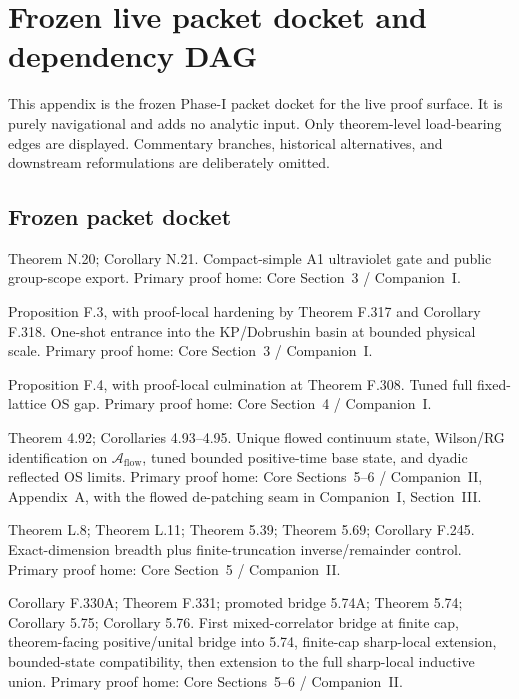 
\section{Frozen live packet docket and dependency DAG}\label{app:packet-docket}

This appendix is the frozen Phase-I packet docket for the live proof surface. It is purely navigational and adds no analytic input. Only theorem-level load-bearing edges are displayed. Commentary branches, historical alternatives, and downstream reformulations are deliberately omitted.

\subsection*{Frozen packet docket}
\begin{description}[leftmargin=2.2em,style=nextline]
\item[Packet 1.] Theorem N.20; Corollary N.21. Compact-simple A1 ultraviolet gate and public group-scope export. Primary proof home: Core Section~3 / Companion~I.
\item[Packet 2.] Proposition F.3, with proof-local hardening by Theorem F.317 and Corollary F.318. One-shot entrance into the KP/Dobrushin basin at bounded physical scale. Primary proof home: Core Section~3 / Companion~I.
\item[Packet 3.] Proposition F.4, with proof-local culmination at Theorem F.308. Tuned full fixed-lattice OS gap. Primary proof home: Core Section~4 / Companion~I.
\item[Packet 4.] Theorem 4.92; Corollaries 4.93--4.95. Unique flowed continuum state, Wilson/RG identification on $\mathcal A_{\mathrm{flow}}$, tuned bounded positive-time base state, and dyadic reflected OS limits. Primary proof home: Core Sections~5--6 / Companion~II, Appendix~A, with the flowed de-patching seam in Companion~I, Section~III.
\item[Packet 5.] Theorem L.8; Theorem L.11; Theorem 5.39; Theorem 5.69; Corollary F.245. Exact-dimension breadth plus finite-truncation inverse/remainder control. Primary proof home: Core Section~5 / Companion~II.
\item[Packet 6.] Corollary F.330A; Theorem F.331; promoted bridge 5.74A; Theorem 5.74; Corollary 5.75; Corollary 5.76. First mixed-correlator bridge at finite cap, theorem-facing positive/unital bridge into 5.74, finite-cap sharp-local extension, bounded-state compatibility, then extension to the full sharp-local inductive union. Primary proof home: Core Sections~5--6 / Companion~II.

\end{description}
